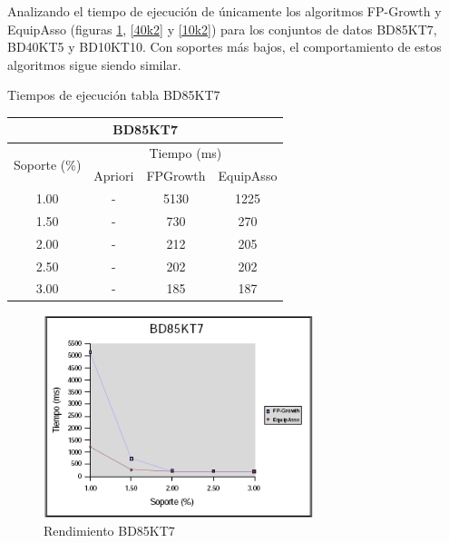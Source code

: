 \newpage

Analizando el tiempo de ejecuci\'on de \'unicamente los algoritmos FP-Growth y EquipAsso (figuras \ref{85k2}, 
\ref{40k2} y \ref{10k2}) para los conjuntos de datos BD85KT7, BD40KT5 y BD10KT10. Con soportes m\'as bajos, el
comportamiento de estos algoritmos sigue siendo similar.

\begin{table}[h]
\caption{Tiempos de ejecuci\'on tabla BD85KT7}
\end{table}
\begin{center}
\begin{tabular}{|*{4}{c|}} \hline
\multicolumn{4}{|c|}{\textbf{BD85KT7}}\\ \hline\hline
\multirow{2}{*}{Soporte (\%)} & \multicolumn{3}{|c|}{Tiempo (ms)}\\ \cline{2-4}
     & Apriori & FPGrowth & EquipAsso\\ \hline
1.00 & - & 5130 & 1225\\ \hline
1.50 & - &  730 & 270\\ \hline
2.00 & - &  212 & 205\\ \hline
2.50 & - &  202 & 202\\ \hline
3.00 & - &  185 & 187\\ \hline
\end{tabular}
\end{center}

\begin{figure}[h]
\centering
\includegraphics[width=0.7\textwidth]{images/bd85kt72.png}
\caption{Rendimiento BD85KT7}
\label{85k2}
\end{figure}

